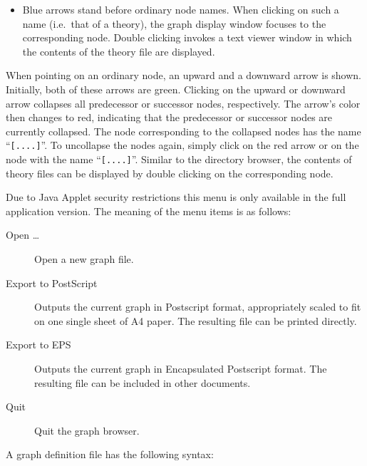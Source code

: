 \begin{isabellebody}
\begin{isamarkuptext}
\begin{itemize}
  \item Blue arrows stand before ordinary node names. When clicking on
  such a name (i.e.\ that of a theory), the graph display window
  focuses to the corresponding node. Double clicking invokes a text
  viewer window in which the contents of the theory file are
  displayed.

  \end{itemize}%
\end{isamarkuptext}%
\isamarkuptrue%
%
\isamarkuptrue%
%
\begin{isamarkuptext}%
When pointing on an ordinary node, an upward and a downward arrow is
  shown.  Initially, both of these arrows are green. Clicking on the
  upward or downward arrow collapses all predecessor or successor
  nodes, respectively. The arrow's color then changes to red,
  indicating that the predecessor or successor nodes are currently
  collapsed. The node corresponding to the collapsed nodes has the
  name ``\verb|[....]|''. To uncollapse the nodes again, simply
  click on the red arrow or on the node with the name ``\verb|[....]|''. Similar to the directory browser, the contents of
  theory files can be displayed by double clicking on the
  corresponding node.%
\end{isamarkuptext}%
\isamarkuptrue%
%
\isamarkuptrue%
%
\begin{isamarkuptext}%
Due to Java Applet security restrictions this menu is only available
  in the full application version. The meaning of the menu items is as
  follows:

  \begin{description}

  \item[Open \dots] Open a new graph file.

  \item[Export to PostScript] Outputs the current graph in Postscript
  format, appropriately scaled to fit on one single sheet of A4 paper.
  The resulting file can be printed directly.

  \item[Export to EPS] Outputs the current graph in Encapsulated
  Postscript format. The resulting file can be included in other
  documents.

  \item[Quit] Quit the graph browser.

  \end{description}%
\end{isamarkuptext}%
\isamarkuptrue%
%
\isamarkuptrue%
%
\begin{isamarkuptext}%
A graph definition file has the following syntax:


\end{isamarkuptext}
\end{isabellebody}
